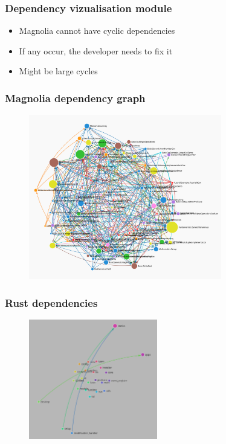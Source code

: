 \begin{frame}
  \frametitle{Dependency vizualisation module}
  \begin{itemize}
    \item Magnolia cannot have cyclic dependencies
    \pause
    \item If any occur, the developer needs to fix it
    \pause
    \item Might be large cycles
  \end{itemize}
\end{frame}

\begin{frame}
  \frametitle{Magnolia dependency graph}
  \begin{figure}
    \centering
    \includegraphics[width=0.75\textwidth]{./pics/magnolia-dependencies.png}
  \end{figure}
\end{frame}

\begin{frame}
  \frametitle{Rust dependencies}
  \begin{figure}
    \centering
    \includegraphics[width=0.5\textwidth]{./pics/rust-deps.png}
  \end{figure}
\end{frame}

